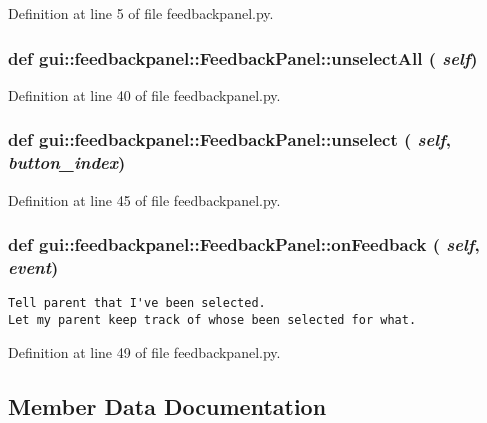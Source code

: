 Definition at line 5 of file feedbackpanel.py.
\subsubsection{\setlength{\rightskip}{0pt plus 5cm}def gui::feedbackpanel::FeedbackPanel::unselectAll ( {\em self})}\label{classgui_1_1feedbackpanel_1_1FeedbackPanel_0fe7bf617b19988d8a5cfd161122539d}




Definition at line 40 of file feedbackpanel.py.
\subsubsection{\setlength{\rightskip}{0pt plus 5cm}def gui::feedbackpanel::FeedbackPanel::unselect ( {\em self},  {\em button\_\-index})}\label{classgui_1_1feedbackpanel_1_1FeedbackPanel_7a4236a3937de503ff1015e138f6701a}




Definition at line 45 of file feedbackpanel.py.
\subsubsection{\setlength{\rightskip}{0pt plus 5cm}def gui::feedbackpanel::FeedbackPanel::onFeedback ( {\em self},  {\em event})}\label{classgui_1_1feedbackpanel_1_1FeedbackPanel_6aa27029e1b2e7e74c8ced330318f83f}




\footnotesize\begin{verbatim}
Tell parent that I've been selected.
Let my parent keep track of whose been selected for what.
\end{verbatim}
\normalsize
 

Definition at line 49 of file feedbackpanel.py.

\subsection{Member Data Documentation}
